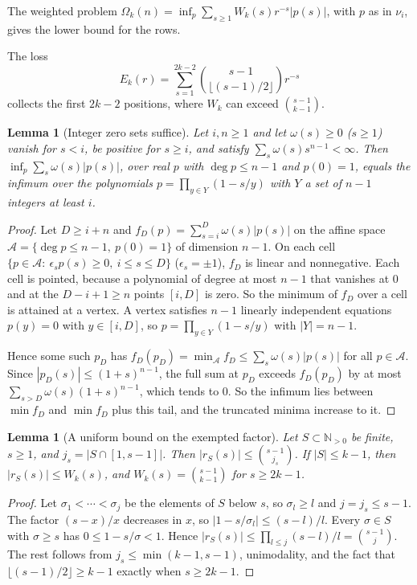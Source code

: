 \documentclass[11pt]{article}
\newtheorem{lemma}[theorem]{Lemma}
\newcommand{\N}{\mathbb N}
\begin{document}
The weighted problem
$\Omega_k(n)=\inf_p\sum_{s\ge1}W_k(s)r^{-s}|p(s)|$, with $p$ as in $\nu_i$,
gives the lower bound for the rows.

The loss
\[
  E_k(r)=\sum_{s=1}^{2k-2}\binom{s-1}{\lfloor(s-1)/2\rfloor}r^{-s}
\]
collects the first $2k-2$ positions, where $W_k$ can exceed
$\binom{s-1}{k-1}$.

\begin{lemma}[Integer zero sets suffice]\label{lem:intzeros}
Let $i,n\ge1$ and let $\omega(s)\ge0$ ($s\ge1$) vanish for $s<i$, be
positive for $s\ge i$, and satisfy $\sum_s\omega(s)s^{n-1}<\infty$.  Then
$\inf_p\sum_s\omega(s)|p(s)|$, over real $p$ with $\deg p\le n-1$ and
$p(0)=1$, equals the infimum over the polynomials
$p=\prod_{y\in Y}(1-s/y)$ with $Y$ a set of $n-1$ integers at least $i$.
\end{lemma}

\begin{proof}
Let $D\ge i+n$ and $f_D(p)=\sum_{s=i}^D\omega(s)|p(s)|$ on the affine space
$\mathcal A=\{\deg p\le n-1,\ p(0)=1\}$ of dimension $n-1$.  On each cell
$\{p\in\mathcal A:\ \epsilon_sp(s)\ge0,\ i\le s\le D\}$
($\epsilon_s=\pm1$), $f_D$ is linear and nonnegative.  Each cell is
pointed, because a polynomial of degree at most $n-1$ that vanishes at $0$
and at the $D-i+1\ge n$ points $[i,D]$ is zero.  So the minimum of $f_D$ over
a cell is attained at a vertex.  A vertex satisfies $n-1$ linearly
independent equations $p(y)=0$ with $y\in[i,D]$, so
$p=\prod_{y\in Y}(1-s/y)$ with $|Y|=n-1$.

Hence some such $p_D$ has $f_D(p_D)=\min_{\mathcal A}f_D\le
\sum_s\omega(s)|p(s)|$ for all $p\in\mathcal A$.  Since
$|p_D(s)|\le(1+s)^{n-1}$, the full sum at $p_D$ exceeds $f_D(p_D)$ by at
most $\sum_{s>D}\omega(s)(1+s)^{n-1}$, which tends to $0$.  So the
infimum lies between $\min f_D$ and $\min f_D$ plus this tail, and the
truncated minima increase
to it.
\end{proof}

\begin{lemma}[A uniform bound on the exempted factor]\label{lem:rowpointwise}
Let $S\subset\N_{>0}$ be finite, $s\ge1$, and $j_s=|S\cap[1,s-1]|$.  Then
$|r_S(s)|\le\binom{s-1}{j_s}$.  If $|S|\le k-1$, then
$|r_S(s)|\le W_k(s)$, and $W_k(s)=\binom{s-1}{k-1}$ for $s\ge2k-1$.
\end{lemma}

\begin{proof}
Let $\sigma_1<\cdots<\sigma_{j}$ be the elements of $S$ below $s$, so
$\sigma_l\ge l$ and $j=j_s\le s-1$.  The factor $(s-x)/x$ decreases in $x$, so
$|1-s/\sigma_l|\le(s-l)/l$.  Every $\sigma\in S$ with $\sigma\ge s$ has
$0\le1-s/\sigma<1$.  Hence
$|r_S(s)|\le\prod_{l\le j}(s-l)/l=\binom{s-1}j$.  The rest follows from
$j_s\le\min(k-1,s-1)$, unimodality, and the fact that
$\lfloor(s-1)/2\rfloor\ge k-1$ exactly when $s\ge2k-1$.
\end{proof}
\end{document}
